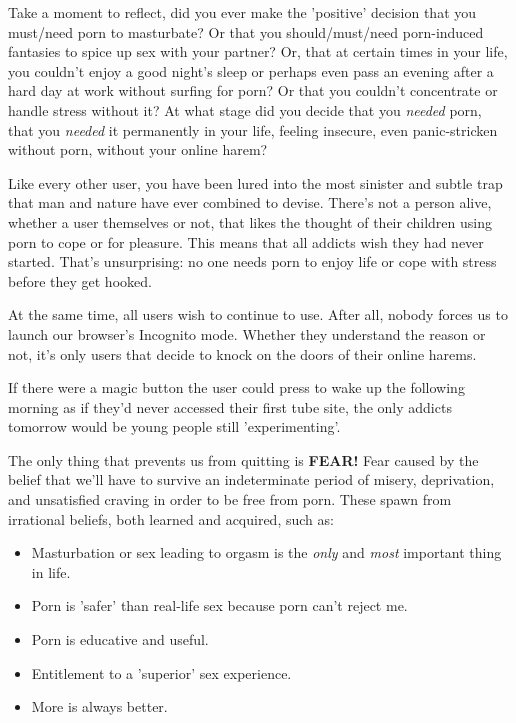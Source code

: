 \documentclass[
]{book}
\begin{document}
Take a moment to reflect, did you ever make the 'positive' decision that you must/need porn to masturbate? Or that you should/must/need porn-induced fantasies to spice up sex with your partner? Or, that at certain times in your life, you couldn't enjoy a good night's sleep or perhaps even pass an evening after a hard day at work without surfing for porn? Or that you couldn't concentrate or handle stress without it? At what stage did you decide that you \emph{needed} porn, that you \emph{needed} it permanently in your life, feeling insecure, even panic-stricken without porn, without your online harem?

Like every other user, you have been lured into the most sinister and subtle trap that man and nature have ever combined to devise. There's not a person alive, whether a user themselves or not, that likes the thought of their children using porn to cope or for pleasure. This means that all addicts wish they had never started. That's unsurprising: no one needs porn to enjoy life or cope with stress before they get hooked.

At the same time, all users wish to continue to use. After all, nobody forces us to launch our browser's Incognito mode. Whether they understand the reason or not, it's only users that decide to knock on the doors of their online harems.

If there were a magic button the user could press to wake up the following morning as if they'd never accessed their first tube site, the only addicts tomorrow would be young people still 'experimenting'.

The only thing that prevents us from quitting is \textbf{FEAR!} Fear caused by the belief that we'll have to survive an indeterminate period of misery, deprivation, and unsatisfied craving in order to be free from porn. These spawn from irrational beliefs, both learned and acquired, such as:

\begin{itemize}
\item
  Masturbation or sex leading to orgasm is the \emph{only} and \emph{most} important thing in life.
\item
  Porn is 'safer' than real-life sex because porn can't reject me.
\item
  Porn is educative and useful.
\item
  Entitlement to a 'superior' sex experience.
\item
  More is always better.
\end{itemize}
\end{document}
